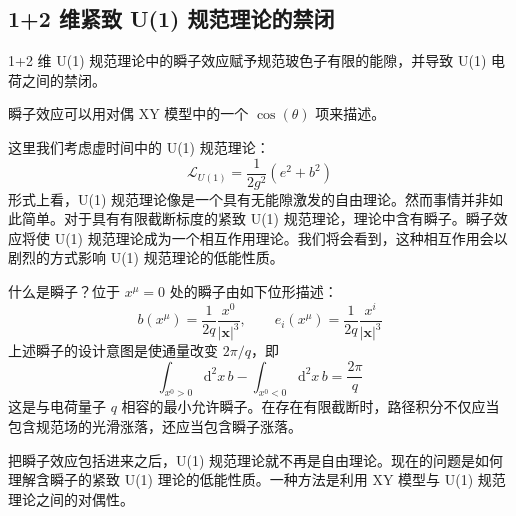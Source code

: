 \subsection{1+2 维紧致 U(1) 规范理论的禁闭}

\begin{keypoints}
\item 1+2 维 U(1) 规范理论中的瞬子效应赋予规范玻色子有限的能隙，并导致 U(1) 电荷之间的禁闭。
\item 瞬子效应可以用对偶 XY 模型中的一个 $\cos(\theta)$ 项来描述。
\end{keypoints}

这里我们考虑虚时间中的 U(1) 规范理论：
\begin{equation*}
\mathcal{L}_{U(1)}=\frac{1}{2g^{2}}\left(e^{2}+b^{2}\right) \tag{6.3.10}
\end{equation*}
形式上看，U(1) 规范理论像是一个具有无能隙激发的自由理论。然而事情并非如此简单。对于具有有限截断标度的紧致 U(1) 规范理论，理论中含有瞬子。瞬子效应将使 U(1) 规范理论成为一个相互作用理论。我们将会看到，这种相互作用会以剧烈的方式影响 U(1) 规范理论的低能性质。

什么是瞬子？位于 $x^{\mu}=0$ 处的瞬子由如下位形描述：
\begin{equation*}
b(x^{\mu})=\frac{1}{2q}\frac{x^{0}}{|\pmb{x}|^{3}}, \qquad e_{i}(x^{\mu})=\frac{1}{2q}\frac{x^{i}}{|\pmb{x}|^{3}}
\end{equation*}
上述瞬子的设计意图是使通量改变 $2\pi/q$，即
\begin{equation*}
\int_{x^{0}>0}\mathrm{d}^{2}x\,b-\int_{x^{0}<0}\mathrm{d}^{2}x\,b=\frac{2\pi}{q}
\end{equation*}
这是与电荷量子 $q$ 相容的最小允许瞬子。在存在有限截断时，路径积分不仅应当包含规范场的光滑涨落，还应当包含瞬子涨落。

把瞬子效应包括进来之后，U(1) 规范理论就不再是自由理论。现在的问题是如何理解含瞬子的紧致 U(1) 理论的低能性质。一种方法是利用 XY 模型与 U(1) 规范理论之间的对偶性。

